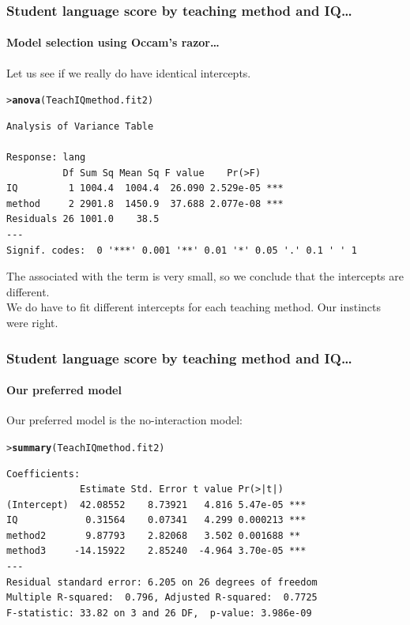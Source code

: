 \documentclass{beamer}\usepackage[]{graphicx}\usepackage[]{xcolor}
\makeatletter
\newcommand{\hlstd}[1]{\textcolor[rgb]{0.345,0.345,0.345}{#1}}%
\newcommand{\hlkwd}[1]{\textcolor[rgb]{0.737,0.353,0.396}{\textbf{#1}}}%
\newenvironment{kframe}{%
 \def\at@end@of@kframe{}%
 \ifinner\ifhmode%
  \def\at@end@of@kframe{\end{minipage}}%
  \begin{minipage}{\columnwidth}%
 \fi\fi%
 \def\FrameCommand##1{\hskip\@totalleftmargin \hskip-\fboxsep
 \colorbox{shadecolor}{##1}\hskip-\fboxsep
     \hskip-\linewidth \hskip-\@totalleftmargin \hskip\columnwidth}%
 \MakeFramed {\advance\hsize-\width
   \@totalleftmargin\z@ \linewidth\hsize
   \@setminipage}}%
 {\par\unskip\endMakeFramed%
 \at@end@of@kframe}
\newenvironment{knitrout}{}{} %
\makeatother
\begin{document}
\begin{frame}[fragile, label={anova1}]
\frametitle{Student language score by  teaching method and IQ\ldots}
\framesubtitle{Model selection using Occam's razor\ldots}
Let us see if we really do have identical intercepts.  \\
\medskip
\begin{knitrout}\scriptsize
{}\color{fgcolor}\begin{kframe}
\begin{alltt}
\hlstd{> }\hlkwd{anova}\hlstd{(TeachIQmethod.fit2)}
\end{alltt}
\begin{verbatim}
Analysis of Variance Table

Response: lang
          Df Sum Sq Mean Sq F value    Pr(>F)    
IQ         1 1004.4  1004.4  26.090 2.529e-05 ***
method     2 2901.8  1450.9  37.688 2.077e-08 ***
Residuals 26 1001.0    38.5                      
---
Signif. codes:  0 '***' 0.001 '**' 0.01 '*' 0.05 '.' 0.1 ' ' 1
\end{verbatim}
\end{kframe}
\end{knitrout}
\medskip
The \pval{} associated with the  term is very small, so we conclude that the intercepts are different.\\
\medskip
We do have to fit different intercepts for each teaching method. Our instincts were right.
\end{frame}


\begin{frame}[fragile]
\frametitle{Student language score by  teaching method and IQ\ldots}
\framesubtitle{Our preferred model}
Our preferred model is the no-interaction model:

\begin{knitrout}\scriptsize
{}\color{fgcolor}\begin{kframe}
\begin{alltt}
\hlstd{> }\hlkwd{summary}\hlstd{(TeachIQmethod.fit2)}
\end{alltt}
\end{kframe}
\end{knitrout}

\begin{knitrout}\scriptsize
{}\color{fgcolor}\begin{kframe}
\begin{verbatim}
Coefficients:
             Estimate Std. Error t value Pr(>|t|)    
(Intercept)  42.08552    8.73921   4.816 5.47e-05 ***
IQ            0.31564    0.07341   4.299 0.000213 ***
method2       9.87793    2.82068   3.502 0.001688 ** 
method3     -14.15922    2.85240  -4.964 3.70e-05 ***
---
Residual standard error: 6.205 on 26 degrees of freedom
Multiple R-squared:  0.796,	Adjusted R-squared:  0.7725 
F-statistic: 33.82 on 3 and 26 DF,  p-value: 3.986e-09
\end{verbatim}
\end{kframe}
\end{knitrout}
\vfill
\end{frame}
\end{document}
